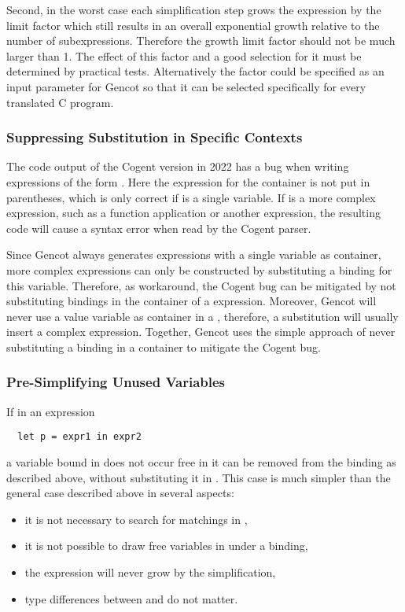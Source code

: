 Second, in the worst case each simplification step grows the expression by the limit factor which still results in an overall exponential growth
relative to the number of subexpressions. Therefore the growth limit factor should not be much larger than 1. The effect of this
factor and a good selection for it must be determined by practical tests. Alternatively the factor could be specified as an input 
parameter for Gencot so that it can be selected specifically for every translated C program.

\subsubsection{Suppressing Substitution in Specific Contexts}

The code output of the Cogent version in 2022 has a bug when writing  expressions of the form . Here the
expression  for the container is not put in parentheses, which is only correct if  is a single variable. If
 is a more complex expression, such as a function application or another  expression, the resulting code will
cause a syntax error when read by the Cogent parser.

Since Gencot always generates  expressions with a single variable as container, more complex expressions can
only be constructed by substituting a binding for this variable. Therefore, as workaround, the Cogent bug can be mitigated by
not substituting bindings in the container of a  expression. Moreover, Gencot will never use a value variable
as container in a , therefore, a substitution will usually insert a complex expression. Together, Gencot uses the
simple approach of never substituting a binding in a  container to mitigate the Cogent bug.

\subsubsection{Pre-Simplifying Unused Variables}

If in an expression
\begin{verbatim}
  let p = expr1 in expr2
\end{verbatim}
a variable bound in  does not occur free in  it can be removed from the binding  as described above,
without substituting it in . This case is much simpler than the general case described above in several aspects:
\begin{itemize}
\item it is not necessary to search for matchings in ,
\item it is not possible to draw free variables in  under a binding,
\item the expression will never grow by the simplification,
\item type differences between  and  do not matter.
\end{itemize}

